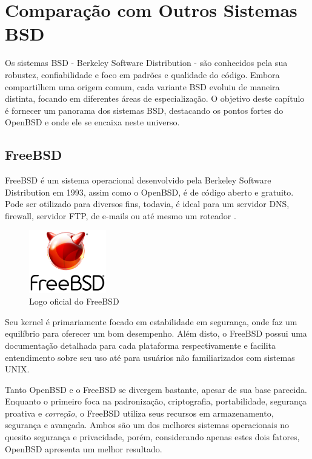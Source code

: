 \documentclass[a4paper,10pt]{article}
\begin{document}
\section{Comparação com Outros Sistemas BSD}

Os sistemas BSD - Berkeley Software Distribution - são conhecidos pela sua robustez, confiabilidade e foco em padrões e qualidade do código. Embora compartilhem uma origem comum, cada variante BSD evoluiu de maneira distinta, focando em diferentes áreas de especialização. O objetivo deste capítulo é fornecer um panorama dos sistemas BSD, destacando os pontos fortes do OpenBSD e onde ele se encaixa neste universo.

\subsection{FreeBSD}
FreeBSD é um sistema operacional desenvolvido pela Berkeley Software Distribution em 1993, assim como o OpenBSD, é de código aberto e gratuito. Pode ser otilizado para diversos fins, todavia, é ideal para um servidor DNS, firewall, servidor FTP, de e-mails ou até mesmo um roteador \cite{izurieta2006evolution}.

\begin{figure}[!ht]
    \centering
    \includegraphics[width=0.3\textwidth]{imagens/logo-freebsd.png}
    \caption{Logo oficial do FreeBSD}
\end{figure}

Seu kernel é primariamente focado em estabilidade em segurança, onde faz um equilíbrio para oferecer um bom desempenho. Além disto, o FreeBSD possui uma documentação detalhada para cada plataforma respectivamente e facilita entendimento sobre seu uso até para usuários não familiarizados com sistemas UNIX.

Tanto OpenBSD e o FreeBSD se divergem bastante, apesar de sua base parecida. Enquanto o primeiro foca na padronização, criptografia, portabilidade, segurança proativa e \textit{correção}, o FreeBSD utiliza seus recursos em armazenamento, segurança e avançada. Ambos são um dos melhores sistemas operacionais no quesito segurança e privacidade, porém, considerando apenas estes dois fatores, OpenBSD apresenta um melhor resultado.
\end{document}
